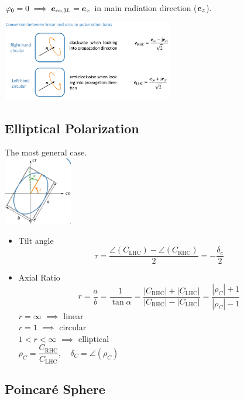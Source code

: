 $\varphi_{0} = 0 \implies \boldsymbol{e}_{\text{co,3L}} = \boldsymbol{e}_{x}$ in main radiation direction ($\boldsymbol{e}_{z}$).

\includegraphics[width=7.5cm]{content/at_meas/pictures/linear_and_circular_polarization_conversion}

\subsection{Elliptical Polarization}

The most general case.\\
\includegraphics[width=3cm]{content/at_meas/pictures/elliptical_polarization}\\
\begin{itemize}
    \item Tilt angle
    \begin{equation*}
      \tau = \dfrac{\angle(C_{\text{LHC}}) - \angle(C_{\text{RHC}})}{2} = -\dfrac{\delta_{c}}{2}
    \end{equation*}
   \item Axial Ratio
   \begin{equation*}
     r = \dfrac{a}{b} = \dfrac{1}{\tan \alpha} = \dfrac{|C_{\text{RHC}}| + |C_{\text{LHC}}|}{|C_{\text{RHC}}| - |C_{\text{LHC}}|} = \dfrac{|\rho_{C}| + 1}{|\rho_{C}| - 1}
   \end{equation*}
  $r = \infty$ $\implies$ linear\\
  $r = 1$ $\implies$ circular\\
  $1 < r < \infty$ $\implies$ elliptical\\
  $\rho_{C} = \dfrac{C_{\text{RHC}}}{C_{\text{LHC}}}, \quad \delta_{C} = \angle(\rho_{C})$
\end{itemize}


\subsection{Poincaré Sphere}

